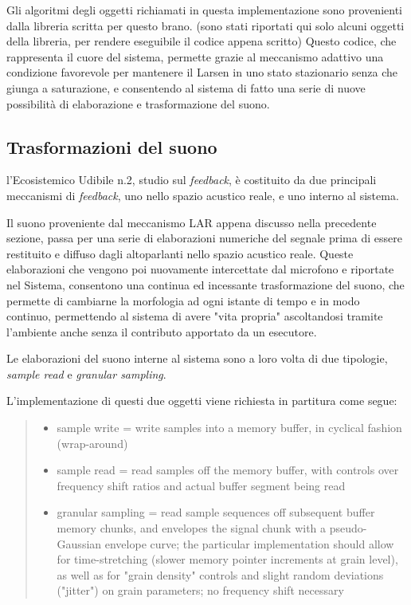 Gli algoritmi degli oggetti richiamati in questa implementazione sono 
provenienti dalla libreria scritta per questo brano.
(sono stati riportati qui solo alcuni oggetti della libreria, per rendere eseguibile
il codice appena scritto)
Questo codice, che rappresenta il cuore del sistema,
permette grazie al meccanismo adattivo una condizione favorevole
per mantenere il Larsen in uno stato stazionario senza che giunga a 
saturazione, e consentendo al sistema
di fatto una serie di nuove possibilità di elaborazione e trasformazione del suono.

\subsection{Trasformazioni del suono}
\label{sec:Trasformazioni del suono}

l’Ecosistemico Udibile n.2, studio sul \emph{feedback}, è costituito
da due principali meccanismi di \emph{feedback}, uno nello spazio acustico reale,
e uno interno al sistema.

Il suono proveniente dal meccanismo LAR appena discusso nella precedente sezione,
passa per una serie di elaborazioni numeriche del segnale prima di essere restituito
e diffuso dagli altoparlanti nello spazio acustico reale. Queste elaborazioni
che vengono poi nuovamente intercettate dal microfono e riportate nel Sistema,
consentono una continua ed incessante trasformazione del suono, che permette
di cambiarne la morfologia ad ogni istante di tempo e in modo continuo, 
permettendo al sistema di avere "vita propria" ascoltandosi tramite l'ambiente
anche senza il contributo apportato da un esecutore.

Le elaborazioni del suono interne al sistema sono a loro volta di due tipologie,
\textit{sample read} e \textit{granular sampling}.

L'implementazione di questi due oggetti viene richiesta in partitura come segue:

\begin{quote}
\begin{itemize}
  \item sample write = write samples into a memory buffer, in cyclical fashion (wrap-around)
  \item sample read = read samples off the memory buffer, with controls over frequency shift ratios and actual buffer segment being read
  \item granular sampling = read sample sequences off subsequent buffer memory chunks, and envelopes the signal chunk with a pseudo-Gaussian envelope curve; the particular
    implementation should allow for time-stretching (slower memory pointer increments at grain level), as well as for "grain density" controls and slight random deviations ("jitter") on
    grain parameters; no frequency shift necessary
\end{itemize}
\end{quote}


